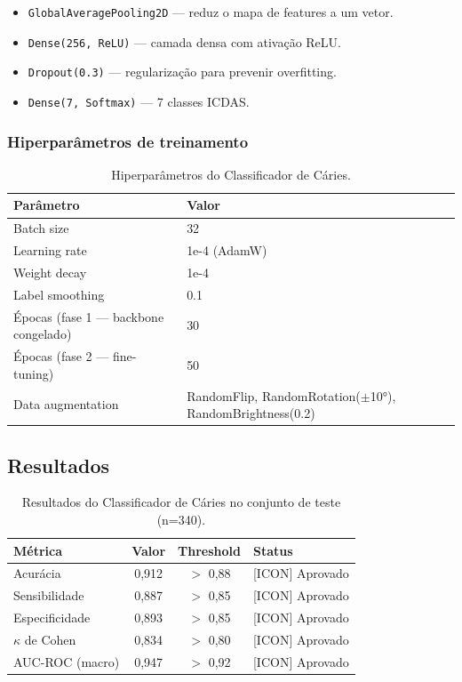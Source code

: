 \begin{itemize}
  \item \texttt{GlobalAveragePooling2D} — reduz o mapa de features a um vetor.
  \item \texttt{Dense(256, ReLU)} — camada densa com ativação ReLU.
  \item \texttt{Dropout(0.3)} — regularização para prevenir overfitting.
  \item \texttt{Dense(7, Softmax)} — 7 classes ICDAS.
\end{itemize}

\subsubsection{Hiperparâmetros de treinamento}

\begin{table}[H]
  \centering
  \caption{Hiperparâmetros do Classificador de Cáries.}
  \label{tab:caries-hyperparams}
  \begin{tabularx}{\textwidth}{lX}
    \toprule
    \textbf{Parâmetro} & \textbf{Valor} \\
    \midrule
    Batch size & 32 \\
    Learning rate & 1e-4 (AdamW) \\
    Weight decay & 1e-4 \\
    Label smoothing & 0.1 \\
    Épocas (fase 1 — backbone congelado) & 30 \\
    Épocas (fase 2 — fine-tuning) & 50 \\
    Data augmentation & RandomFlip, RandomRotation($\pm$10°), RandomBrightness(0.2) \\
    \bottomrule
  \end{tabularx}
\end{table}

\subsection{Resultados}

\begin{table}[H]
  \centering
  \caption{Resultados do Classificador de Cáries no conjunto de teste (n=340).}
  \label{tab:caries-results}
  \begin{tabularx}{\textwidth}{lccX}
    \toprule
    \textbf{Métrica} & \textbf{Valor} & \textbf{Threshold} & \textbf{Status} \\
    \midrule
    Acurácia & 0,912 & $>$ 0,88 & \textcolor{corTesteSucesso}{[ICON] Aprovado} \\
    Sensibilidade & 0,887 & $>$ 0,85 & \textcolor{corTesteSucesso}{[ICON] Aprovado} \\
    Especificidade & 0,893 & $>$ 0,85 & \textcolor{corTesteSucesso}{[ICON] Aprovado} \\
    $\kappa$ de Cohen & 0,834 & $>$ 0,80 & \textcolor{corTesteSucesso}{[ICON] Aprovado} \\
    AUC-ROC (macro) & 0,947 & $>$ 0,92 & \textcolor{corTesteSucesso}{[ICON] Aprovado} \\
    \bottomrule
  \end{tabularx}
\end{table}

